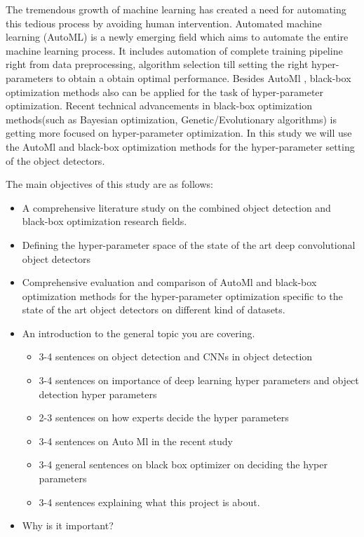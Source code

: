 \documentclass[thesis]{mas_proposal}
\begin{document}
The tremendous growth of machine learning has created a need for automating this tedious process by avoiding human intervention. Automated machine learning (AutoML) is a newly emerging field which aims to automate the entire machine learning process. It includes automation of complete training pipeline right from data preprocessing, algorithm selection till setting the right hyper-parameters to obtain a obtain optimal performance. Besides AutoMl , black-box optimization methods also can be applied for the task of hyper-parameter optimization. Recent technical advancements in black-box optimization methods(such as Bayesian optimization, Genetic/Evolutionary algorithms) is getting more focused on hyper-parameter optimization. In this study we will use the AutoMl and black-box optimization methods for the hyper-parameter setting of the  object detectors.

The main objectives of this study are as follows: 
\begin{itemize}
    \item A comprehensive literature study on the combined object detection and black-box optimization research fields.
    \item Defining the hyper-parameter space of the state of the art deep convolutional object detectors 
    \item Comprehensive evaluation and comparison of  AutoMl and black-box optimization methods for the hyper-parameter optimization specific to the state of the art object detectors on different kind of datasets.
\end{itemize}
 








\begin{itemize}
    \item An introduction to the general topic you are covering.
    \begin{itemize}
    \item 3-4 sentences on object detection and CNNs in object detection
    
    \item 3-4 sentences on importance of deep learning hyper parameters and object detection hyper parameters
    \item 2-3 sentences on how experts decide the hyper parameters
    \item 3-4 sentences on Auto Ml in the recent study
    \item 3-4 general sentences on black box optimizer on deciding the hyper parameters
    \item 3-4 sentences explaining what this project is about.
    \end{itemize}
    \item Why is it important?
    
\end{itemize}
\end{document}
